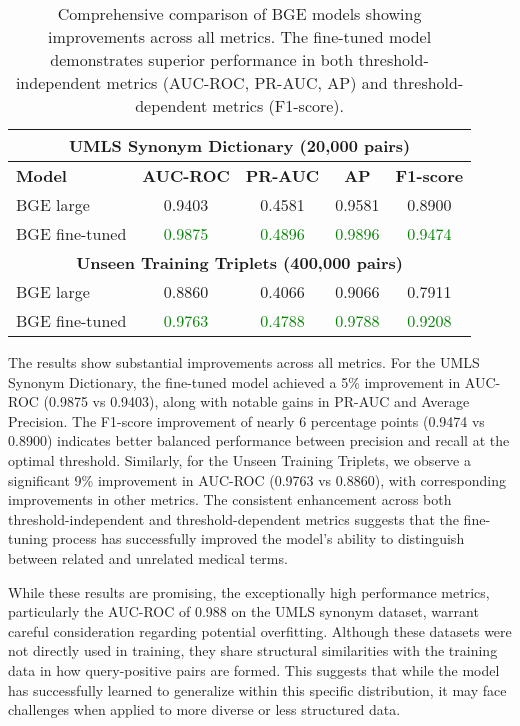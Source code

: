 \begin{table}[h]
    \centering
    \begin{tabular}{|l|c|c|c|c|}
        \hline
        \multicolumn{5}{|c|}{\textbf{UMLS Synonym Dictionary (20,000 pairs)}} \\
        \hline
        \textbf{Model} & \textbf{AUC-ROC} & \textbf{PR-AUC} & \textbf{AP} & \textbf{F1-score} \\
        \hline
        BGE large & 0.9403 & 0.4581 & 0.9581 & 0.8900 \\
        BGE fine-tuned & \textcolor{green}{0.9875} & \textcolor{green}{0.4896} & \textcolor{green}{0.9896} & \textcolor{green}{0.9474} \\
        \hline
        \multicolumn{5}{|c|}{\textbf{Unseen Training Triplets (400,000 pairs)}} \\
        \hline
        BGE large & 0.8860 & 0.4066 & 0.9066 & 0.7911 \\
        BGE fine-tuned & \textcolor{green}{0.9763} & \textcolor{green}{0.4788} & \textcolor{green}{0.9788} & \textcolor{green}{0.9208} \\
        \hline
    \end{tabular}
    \caption{Comprehensive comparison of BGE models showing improvements across all metrics. The fine-tuned model demonstrates superior performance in both threshold-independent metrics (AUC-ROC, PR-AUC, AP) and threshold-dependent metrics (F1-score).}
    \label{tab:auc_results}
\end{table}

The results show substantial improvements across all metrics. For the UMLS Synonym Dictionary, the fine-tuned model achieved a 5\% improvement in AUC-ROC (0.9875 vs 0.9403), along with notable gains in PR-AUC and Average Precision. The F1-score improvement of nearly 6 percentage points (0.9474 vs 0.8900) indicates better balanced performance between precision and recall at the optimal threshold. Similarly, for the Unseen Training Triplets, we observe a significant 9\% improvement in AUC-ROC (0.9763 vs 0.8860), with corresponding improvements in other metrics. The consistent enhancement across both threshold-independent and threshold-dependent metrics suggests that the fine-tuning process has successfully improved the model's ability to distinguish between related and unrelated medical terms.

While these results are promising, the exceptionally high performance metrics, particularly the AUC-ROC of 0.988 on the UMLS synonym dataset, warrant careful consideration regarding potential overfitting. Although these datasets were not directly used in training, they share structural similarities with the training data in how query-positive pairs are formed. This suggests that while the model has successfully learned to generalize within this specific distribution, it may face challenges when applied to more diverse or less structured data.

